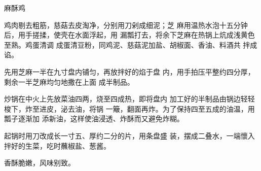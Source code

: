\begin{recipe}{麻酥鸡}

\ingredients



\cooking

\step 鸡肉剔去粗筋，慈菇去皮淘净，分别用刀剁成细泥；芝 麻用温热水泡十五分钟后，用手搓揉，使壳在水面浮起，用 漏瓢打去，将余下芝麻在热锅上炕成浅黄色至熟。鸡蛋清调 成蛋清豆粉，同鸡泥、慈菇泥加盐、胡椒面、香油、料酒共 拌成谄。

\step 先用芝麻一半在九寸盘内铺匀，再放拌好的焰于盘 内，用手拍压平整约四分厚，剩余一半芝麻均匀地撒在上面 成半制品。

\step 炒锅在中火上先放菜油四两，烧至四成热，即将盘内 加工好的半制品由锅边轻轻梭下，炸至进皮，泌去油，将锅 一簸，翻面再炸。为了保持四至五成的油温，用瓢子逐渐加 添新油，这样使油浸透、炸酥而又避免炸糊。

\step 起锅时用刀改成长一寸五、厚约二分的片，用条盘盛 装，摆成二叠水，一端懷入拌好的生菜，吃时蘸椒盐、葱酱。

\notes

香酥脆嫩，风味别致。

\end{recipe}

